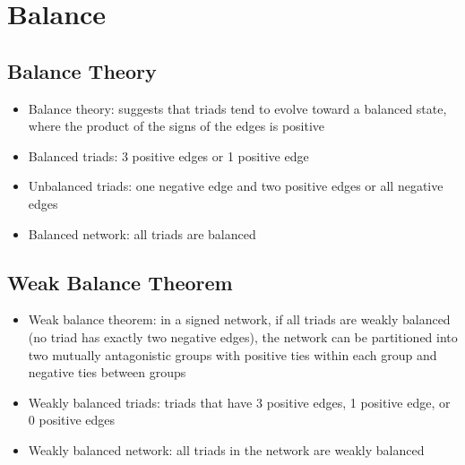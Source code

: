 \chapter{Balance}

\section{Balance Theory}
\begin{itemize}
    \item Balance theory: suggests that triads tend to evolve toward a balanced state, where the product of the signs of the edges is positive
    \item Balanced triads: 3 positive edges or 1 positive edge
    \item Unbalanced triads: one negative edge and two positive edges or all negative edges
    \item Balanced network: all triads are balanced
\end{itemize}

\section{Weak Balance Theorem}
\begin{itemize}
    \item Weak balance theorem: in a signed network, if all triads are weakly balanced (no triad has exactly two negative edges), the network can be partitioned into two mutually antagonistic groups with positive ties within each group and negative ties between groups
    \item Weakly balanced triads: triads that have 3 positive edges, 1 positive edge, or 0 positive edges
    \item Weakly balanced network: all triads in the network are weakly balanced
\end{itemize}